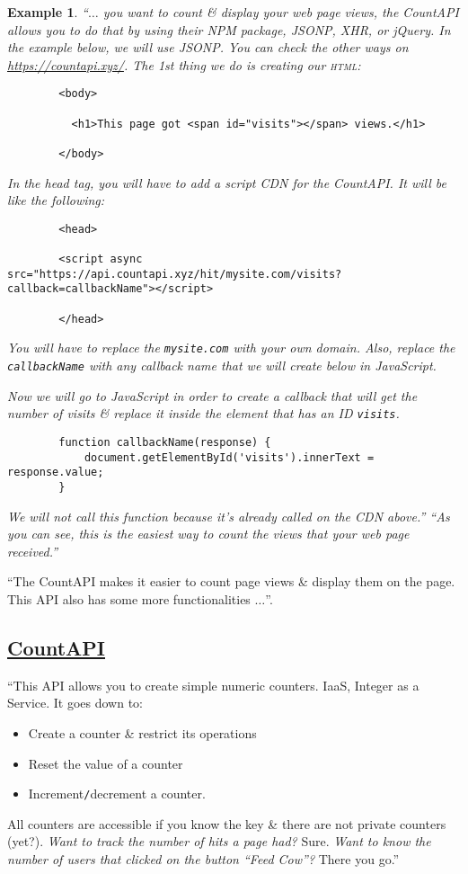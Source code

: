 \documentclass{article}
\numberwithin{equation}{section}
\newtheorem{example}{Example}[section]
\begin{document}
\begin{example}
	``$\ldots$ you want to count \& display your web page views, the CountAPI allows you to do that by using their NPM package, JSONP, XHR, or jQuery. In the example below, we will use JSONP. You can check the other ways on \url{https://countapi.xyz/}. The 1st thing we do is creating our \textsc{html}:	
	\begin{verbatim}
		<body>
		
		  <h1>This page got <span id="visits"></span> views.</h1>
		
		</body>
	\end{verbatim}
	In the head tag, you will have to add a script CDN for the CountAPI. It will be like the following:	
	\begin{verbatim}
		<head>
		
		<script async src="https://api.countapi.xyz/hit/mysite.com/visits?  callback=callbackName"></script>
		
		</head>
	\end{verbatim}
	You will have to replace the \verb|mysite.com| with your own domain. Also, replace the \verb|callbackName| with any callback name that we will create below in JavaScript.
	
	Now we will go to JavaScript in order to create a callback that will get the number of visits \& replace it inside the element that has an ID \verb|visits|.	
	\begin{verbatim}
		function callbackName(response) {
		    document.getElementById('visits').innerText = response.value;
		}
	\end{verbatim}
	We will not call this function because it's already called on the CDN above.'' ``As you can see, this is the easiest way to count the views that your web page received.''
\end{example}
``The CountAPI makes it easier to count page views \& display them on the page. This API also has some more functionalities $\ldots$''.

\subsection{\href{https://countapi.xyz/}{CountAPI}}
``This API allows you to create simple numeric counters. IaaS, Integer as a Service. It goes down to:
\begin{itemize}
	\item Create a counter \& restrict its operations
	\item Reset the value of a counter
	\item Increment\texttt{/}decrement a counter.
\end{itemize}
All counters are accessible if you know the key \& there are not private counters (yet?). \textit{Want to track the number of hits a page had?} Sure. \textit{Want to know the number of users that clicked on the button ``Feed Cow''?} There you go.''
\end{document}
